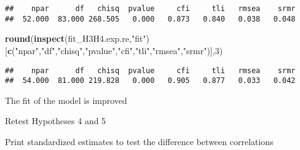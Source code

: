 \documentclass[
]{article}
\newenvironment{Shaded}{\begin{snugshade}}{\end{snugshade}}
\newcommand{\DecValTok}[1]{\textcolor[rgb]{0.00,0.00,0.81}{#1}}
\newcommand{\KeywordTok}[1]{\textcolor[rgb]{0.13,0.29,0.53}{\textbf{#1}}}
\newcommand{\NormalTok}[1]{#1}
\newcommand{\OperatorTok}[1]{\textcolor[rgb]{0.81,0.36,0.00}{\textbf{#1}}}
\newcommand{\StringTok}[1]{\textcolor[rgb]{0.31,0.60,0.02}{#1}}
\begin{document}
\begin{verbatim}
##    npar      df   chisq  pvalue     cfi     tli   rmsea    srmr 
##  52.000  83.000 268.505   0.000   0.873   0.840   0.038   0.048
\end{verbatim}

\begin{Shaded}
\begin{Highlighting}[]
\KeywordTok{round}\NormalTok{(}\KeywordTok{inspect}\NormalTok{(fit_H3H4.exp.re,}\StringTok{"fit"}\NormalTok{)}
\NormalTok{      [}\KeywordTok{c}\NormalTok{(}\StringTok{"npar"}\NormalTok{,}\StringTok{"df"}\NormalTok{,}\StringTok{"chisq"}\NormalTok{,}\StringTok{"pvalue"}\NormalTok{,}\StringTok{"cfi"}\NormalTok{,}\StringTok{"tli"}\NormalTok{,}\StringTok{"rmsea"}\NormalTok{,}\StringTok{"srmr"}\NormalTok{)],}\DecValTok{3}\NormalTok{)}
\end{Highlighting}
\end{Shaded}

\begin{verbatim}
##    npar      df   chisq  pvalue     cfi     tli   rmsea    srmr 
##  54.000  81.000 219.828   0.000   0.905   0.877   0.033   0.042
\end{verbatim}

The fit of the model is improved

Retest Hypotheses 4 and 5

Print standardized estimates to test the difference between correlations

\begin{Shaded}
\end{Shaded}
\end{document}
